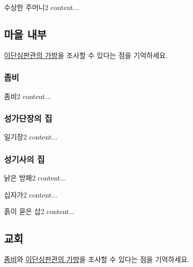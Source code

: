 \documentclass{report}
\begin{document}
					\begin{spoiler}{수상한 주머니}{2}
						content...
					\end{spoiler}
				
			\subsection*{마을 내부}
				\hyperlink{search:bag}{이단심판관의 가방}을 조사할 수 있다는 점을 기억하세요.
				
				\hypertarget{search:zombie}{}
				\subsubsection*{좀비}
					\begin{spoiler}[search:]{좀비}{2}
						content...
					\end{spoiler}
				
				\hypertarget{search:choir-leader}{}
				\subsubsection*{성가단장의 집}
					\begin{spoiler}{일기장}{2}
						content...
					\end{spoiler}
				
				\hypertarget{search:paladin}{}
				\subsubsection*{성기사의 집}
					
					\begin{spoiler}{낡은 방패}{2}
						content...
					\end{spoiler}
					
					\begin{spoiler}{십자가}{2}
						content...
					\end{spoiler}
					
					\begin{spoiler}{흙이 묻은 삽}{2}
						content...
					\end{spoiler}
				
			\subsection*{교회}
				\hyperlink{search:zombie}{좀비}와 \hyperlink{search:bag}{이단심판관의 가방}을 조사할 수 있다는 점을 기억하세요.
				
\end{document}
